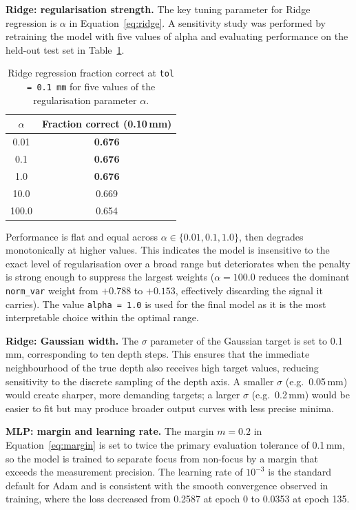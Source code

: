 \documentclass{article}
\begin{document}
\textbf{Ridge: regularisation strength.} The key tuning parameter for Ridge regression is $\alpha$ in Equation~\ref{eq:ridge}. A sensitivity study was performed by retraining the model with five values of alpha and evaluating performance on the held-out test set in Table~\ref{tab:alpha}.

\begin{table}[htbp]
    \centering
    \caption{Ridge regression fraction correct at \texttt{tol = 0.1\,mm} for five values of the regularisation parameter $\alpha$.}
    \begin{tabular}{cc}
        \toprule
        $\alpha$ & Fraction correct (0.10\,mm) \\
        \midrule
        0.01  & \textbf{0.676} \\
        0.1   & \textbf{0.676} \\
        1.0   & \textbf{0.676} \\
        10.0  & 0.669 \\
        100.0 & 0.654 \\
        \bottomrule
    \end{tabular}
    \label{tab:alpha}
\end{table}

Performance is flat and equal across $\alpha \in \{0.01, 0.1, 1.0\}$, then degrades monotonically at higher values. This indicates the model is insensitive to the exact level of regularisation over a broad range but deteriorates when the penalty is strong enough to suppress the largest weights ($\alpha = 100.0$ reduces the dominant \texttt{norm\_var} weight from $+0.788$ to $+0.153$, effectively discarding the signal it carries). The value \texttt{alpha = 1.0} is used for the final model as it is the most interpretable choice within the optimal range.

\textbf{Ridge: Gaussian width.} The $\sigma$ parameter of the Gaussian target is set to 0.1\,mm, corresponding to ten depth steps. This ensures that the immediate neighbourhood of the true depth also receives high target values, reducing sensitivity to the discrete sampling of the depth axis. A smaller $\sigma$ (e.g.\ 0.05\,mm) would create sharper, more demanding targets; a larger $\sigma$ (e.g.\ 0.2\,mm) would be easier to fit but may produce broader output curves with less precise minima.

\textbf{MLP: margin and learning rate.} The margin $m = 0.2$ in Equation~\ref{eq:margin} is set to twice the primary evaluation tolerance of 0.1\,mm, so the model is trained to separate focus from non-focus by a margin that exceeds the measurement precision. The learning rate of $10^{-3}$ is the standard default for Adam and is consistent with the smooth convergence observed in training, where the loss decreased from 0.2587 at epoch 0 to 0.0353 at epoch 135.
\end{document}
